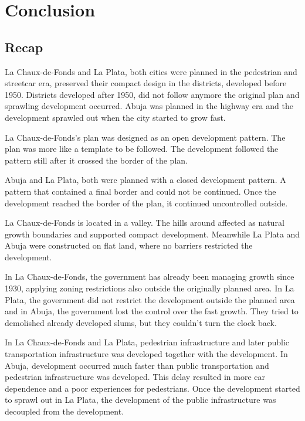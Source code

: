 \documentclass{article}
\begin{document}
	\clearpage
	\section{Conclusion}	
		\subsection{Recap}		
		\begin{multicols}{2}
		\raggedcolumns
	
		La Chaux-de-Fonds and La Plata, both cities were planned in the pedestrian and streetcar era, preserved their compact design in the districts, developed before 1950. Districts developed after 1950, did not follow anymore the original plan and sprawling development occurred.
		Abuja was planned in the highway era and the development sprawled out when the city started to grow fast.
	
		La Chaux-de-Fonds's plan was designed as an open development pattern. The plan was more like a template to be followed. The development followed the pattern still after it crossed the border of the plan.
	
		Abuja and La Plata, both were planned with a closed development pattern. A pattern that contained a final border and could not be continued. Once the development reached the border of the plan, it continued uncontrolled outside.
	
		La Chaux-de-Fonds is located in a valley. The hills around affected as natural growth boundaries and supported compact development. Meanwhile La Plata and Abuja were constructed on flat land, where no barriers restricted the development.
	
		In La Chaux-de-Fonds, the government has already been managing growth since 1930, applying zoning restrictions also outside the originally planned area. In La Plata, the government did not restrict the development outside the planned area and in Abuja, the government lost the control over the fast growth. They tried to demolished already developed slums, but they couldn't turn the clock back.
		
		In La Chaux-de-Fonds and La Plata, pedestrian infrastructure and later public transportation infrastructure was developed together with the development. In Abuja, development occurred much faster than public transportation and pedestrian infrastructure was developed. This delay resulted in more car dependence and a poor experiences for pedestrians. Once the development started to sprawl out in La Plata, the development of the public infrastructure was decoupled from the development.



\end{multicols}
\end{document}
